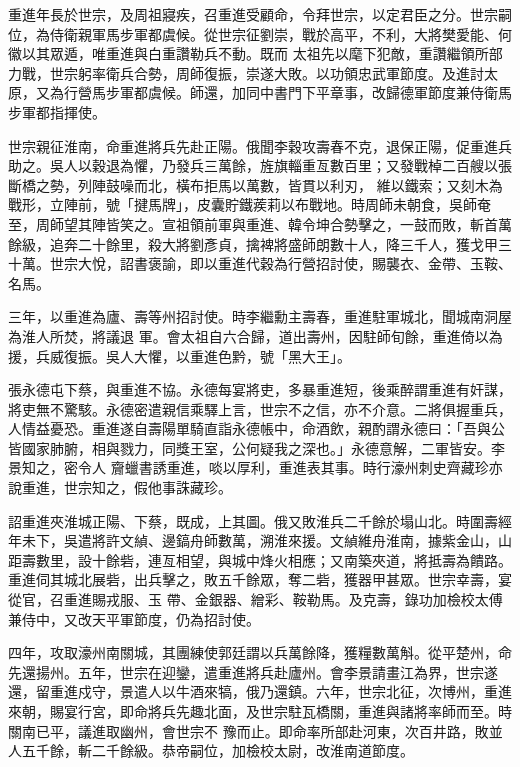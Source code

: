 \begin{pinyinscope}
 重進年長於世宗，及周祖寢疾，召重進受顧命，令拜世宗，以定君臣之分。世宗嗣位，為侍衛親軍馬步軍都虞候。從世宗征劉崇，戰於高平，不利，大將樊愛能、何徽以其眾遁，唯重進與白重讚勒兵不動。既而
 太祖先以麾下犯敵，重讚繼領所部力戰，世宗躬率衛兵合勢，周師復振，崇遂大敗。以功領忠武軍節度。及進討太原，又為行營馬步軍都虞候。師還，加同中書門下平章事，改歸德軍節度兼侍衛馬步軍都指揮使。



 世宗親征淮南，命重進將兵先赴正陽。俄聞李穀攻壽春不克，退保正陽，促重進兵助之。吳人以穀退為懼，乃發兵三萬餘，旌旗輜重亙數百里；又發戰棹二百艘以張斷橋之勢，列陣鼓噪而北，橫布拒馬以萬數，皆貫以利刃，
 維以鐵索；又刻木為戰形，立陣前，號「揵馬牌」，皮囊貯鐵蒺莉以布戰地。時周師未朝食，吳師奄至，周師望其陣皆笑之。宣祖領前軍與重進、韓令坤合勢擊之，一鼓而敗，斬首萬餘級，追奔二十餘里，殺大將劉彥貞，擒裨將盛師朗數十人，降三千人，獲戈甲三十萬。世宗大悅，詔書褒諭，即以重進代穀為行營招討使，賜襲衣、金帶、玉鞍、名馬。



 三年，以重進為廬、壽等州招討使。時李繼勳主壽春，重進駐軍城北，聞城南洞屋為淮人所焚，將議退
 軍。會太祖自六合歸，道出壽州，因駐師旬餘，重進倚以為援，兵威復振。吳人大懼，以重進色黔，號「黑大王」。



 張永德屯下蔡，與重進不協。永德每宴將吏，多暴重進短，後乘醉謂重進有奸謀，將吏無不驚駭。永德密遣親信乘驛上言，世宗不之信，亦不介意。二將俱握重兵，人情益憂恐。重進遂自壽陽單騎直詣永德帳中，命酒飲，親酌謂永德曰：「吾與公皆國家肺腑，相與戮力，同獎王室，公何疑我之深也。」永德意解，二軍皆安。李景知之，密令人
 齎蠟書誘重進，啖以厚利，重進表其事。時行濠州刺史齊藏珍亦說重進，世宗知之，假他事誅藏珍。



 詔重進夾淮城正陽、下蔡，既成，上其圖。俄又敗淮兵二千餘於塌山北。時圍壽經年未下，吳遣將許文緽、邊鎬舟師數萬，溯淮來援。文緽維舟淮南，據紫金山，山距壽數里，設十餘砦，連亙相望，與城中烽火相應；又南築夾道，將抵壽為饋路。重進伺其城北展砦，出兵擊之，敗五千餘眾，奪二砦，獲器甲甚眾。世宗幸壽，宴從官，召重進賜戎服、玉
 帶、金銀器、繒彩、鞍勒馬。及克壽，錄功加檢校太傅兼侍中，又改天平軍節度，仍為招討使。



 四年，攻取濠州南關城，其團練使郭廷謂以兵萬餘降，獲糧數萬斛。從平楚州，命先還揚州。五年，世宗在迎鑾，遣重進將兵赴廬州。會李景請畫江為界，世宗遂還，留重進戍守，景遣人以牛酒來犒，俄乃還鎮。六年，世宗北征，次博州，重進來朝，賜宴行宮，即命將兵先趣北面，及世宗駐瓦橋關，重進與諸將率師而至。時關南已平，議進取幽州，會世宗不
 豫而止。即命率所部赴河東，次百井路，敗並人五千餘，斬二千餘級。恭帝嗣位，加檢校太尉，改淮南道節度。




\end{pinyinscope}
